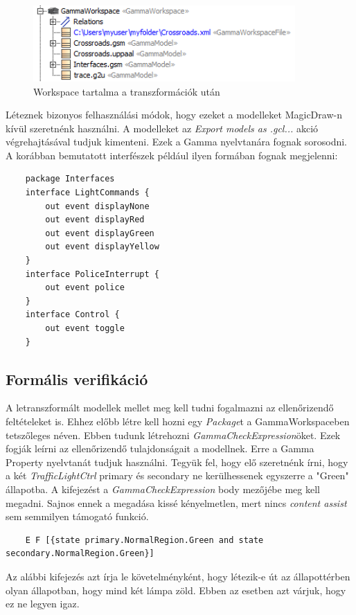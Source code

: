 \begin{figure}[!ht]
	\centering
	\includegraphics[width=10cm, keepaspectratio]{figures/contribution/gwsfinal.png}
	\caption{Workspace tartalma a transzformációk után}
	\label{fig:gwsfinal}
\end{figure}

Léteznek bizonyos felhasználási módok, hogy ezeket a modelleket MagicDraw-n kívül szeretnénk használni. A modelleket az \emph{Export models as .gcl...} akció végrehajtásával tudjuk kimenteni. Ezek a Gamma nyelvtanára fognak sorosodni.
A korábban bemutatott interfészek például ilyen formában fognak megjelenni:

\begin{lstlisting}
	package Interfaces
	interface LightCommands {
		out event displayNone
		out event displayRed
		out event displayGreen
		out event displayYellow
	}
	interface PoliceInterrupt {
		out event police
	}
	interface Control {
		out event toggle
	}
\end{lstlisting}

\subsection{Formális verifikáció}
 
A letranszformált modellek mellet meg kell tudni fogalmazni az ellenőrizendő feltételeket is. Ehhez előbb létre kell hozni egy \emph{Package}t a GammaWorkspaceben tetszőleges néven. Ebben tudunk létrehozni \emph{GammaCheckExpression}öket. Ezek fogják leírni az ellenőrizendő tulajdonságait a modellnek. Erre a Gamma Property nyelvtanát tudjuk használni. Tegyük fel, hogy elő szeretnénk írni, hogy a két \emph{TrafficLightCtrl} primary és secondary ne kerülhessenek egyszerre a "Green" állapotba. A kifejezést a \emph{GammaCheckExpression}  body mezőjébe meg kell megadni. Sajnos ennek a megadása kissé kényelmetlen, mert nincs \emph{content assist} sem semmilyen támogató funkció.

\begin{lstlisting}	
	E F [{state primary.NormalRegion.Green and state secondary.NormalRegion.Green}]
\end{lstlisting}

Az alábbi kifejezés azt írja le követelményként, hogy létezik-e út az állapottérben olyan állapotban, hogy mind két lámpa zöld. Ebben az esetben azt várjuk, hogy ez ne legyen igaz.

